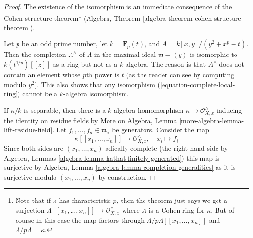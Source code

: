 \documentclass[10pt,a4paper]{amsart}
\theoremstyle{plain}
\theoremstyle{definition}
\theoremstyle{remark}
\numberwithin{equation}{subsection}
\begin{document}
\begin{proof}
The existence of the isomorphism is an immediate consequence of
the Cohen structure theorem\footnote{Note that if $\kappa$ has
characteristic $p$, then the theorem just says we get a surjection
$\Lambda[[x_1, \ldots, x_n]] \to \mathcal{O}_{X, x}^\wedge$ where
$\Lambda$ is a Cohen ring for $\kappa$. But of course in this
case the map factors through $\Lambda/p\Lambda[[x_1, \ldots, x_n]]$
and $\Lambda/p\Lambda = \kappa$.}
(Algebra, Theorem \ref{algebra-theorem-cohen-structure-theorem}).

\medskip\noindent
Let $p$ be an odd prime number, let $k = \mathbf{F}_p(t)$, and
$A = k[x, y]/(y^2 + x^p - t)$. Then the completion $A^\wedge$ of $A$
in the maximal ideal
$\mathfrak m = (y)$ is isomorphic to $k(t^{1/p})[[z]]$ as a ring
but not as a $k$-algebra. The reason is that $A^\wedge$
does not contain an element whose $p$th power is $t$ (as the reader
can see by computing modulo $y^2$).
This also shows that any isomorphism (\ref{equation-complete-local-ring})
cannot be a $k$-algebra isomorphism.

\medskip\noindent
If $\kappa/k$ is separable, then there is a $k$-algebra
homomorphism $\kappa \to \mathcal{O}_{X, x}^\wedge$
inducing the identity on residue fields by
More on Algebra, Lemma \ref{more-algebra-lemma-lift-residue-field}.
Let $f_1, \ldots, f_n \in \mathfrak m_x$ be generators.
Consider the map
$$
\kappa[[x_1, \ldots, x_n]] \longrightarrow \mathcal{O}_{X, x}^\wedge,\quad
x_i \longmapsto f_i
$$
Since both sides are $(x_1, \ldots, x_n)$-adically complete
(the right hand side by
Algebra, Lemmas \ref{algebra-lemma-hathat-finitely-generated})
this map is surjective by
Algebra, Lemma \ref{algebra-lemma-completion-generalities}
as it is surjective modulo $(x_1, \ldots, x_n)$ by
construction.
\end{proof}
\end{document}

